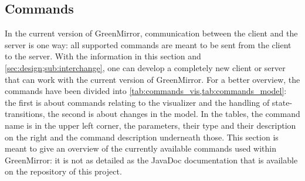 \subsection{Commands}\label{sec:features;sub:commands}
In the current version of GreenMirror, communication between the client and the server is one way: all supported commands are meant to be sent from the client to the server. With the information in this section and \cref{sec:design;sub:interchange}, one can develop a completely new client or server that can work with the current version of GreenMirror. For a better overview, the commands have been divided into \cref{tab:commands_vis,tab:commands_model}: the first is about commands relating to the visualizer and the handling of state-transitions, the second is about changes in the model. In the tables, the command name is in the upper left corner, the parameters, their type and their description on the right and the command description underneath those. This section is meant to give an overview of the currently available commands used within GreenMirror: it is not as detailed as the JavaDoc documentation that is available on the repository of this project.
